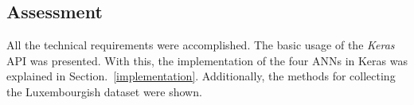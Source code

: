 
\subsection{Assessment}

All the technical requirements were accomplished. The basic usage of the
\textit{Keras} API was presented. With this, the implementation of the four ANNs
in Keras was explained in Section.~\ref{implementation}. Additionally, the
methods for collecting the Luxembourgish dataset were shown.


